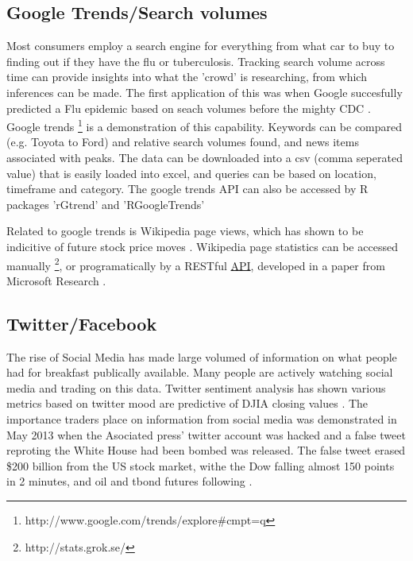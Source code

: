 \documentclass[11pt]{article}
\begin{document}
	\subsection{Google Trends/Search volumes}
	Most consumers employ a search engine for everything from what car to buy to finding out if they have the flu or tuberculosis.
	Tracking search volume across time can provide insights into what the 'crowd' is researching, from which inferences can be made.
	The first application of this was when Google succesfully predicted a Flu epidemic based on seach volumes before the mighty CDC\cite{Ginsberg2009} .
	Google trends \footnote{http://www.google.com/trends/explore\#cmpt=q} is a demonstration of this capability. 
	Keywords can be compared (e.g. Toyota to Ford) and relative search volumes found, and news items associated with peaks. 
	The data can be downloaded into a csv (comma seperated value) that is easily loaded into excel, and queries can be based on location, timeframe and category.
	The google trends API can also be accessed by R packages 'rGtrend' and 'RGoogleTrends'
		

	Related to google trends is Wikipedia page views, which has shown to be indicitive of future stock price moves \cite{Moat2013}.
	Wikipedia page statistics can be accessed manually \footnote{http://stats.grok.se/}, or programatically by a RESTful \hyperref[api]{API}, developed in a paper from Microsoft Research \cite{Peetz}. 

	\subsection{Twitter/Facebook}
	The rise of Social Media has made large volumed of information on what people had for breakfast publically available. 
	Many people are actively watching social media and trading on this data. 
	Twitter sentiment analysis has shown various metrics based on twitter mood are predictive of DJIA closing values \cite{Bollen2011}.
	The importance traders place on information from social media was demonstrated in May 2013 when the Asociated press' twitter account was hacked and a false tweet reproting the White House had been bombed was released. 
	The false tweet erased \$200 billion from the US stock market, withe the Dow falling almost 150  points in 2 minutes, and oil and tbond futures following \cite{wsj13}. 


\newpage

\appendix
\appendixpage
\addappheadtotoc
	
\end{document}
